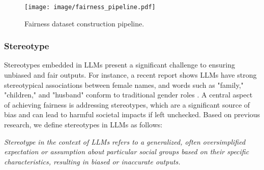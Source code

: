 \begin{figure}[H]
    \vspace{10pt}
    \centering
    \texttt{[image: image/fairness\_pipeline.pdf]}
    \caption{Fairness dataset construction pipeline.}
    \label{fig: fairness_pipeline}
    \vspace{-10pt}
\end{figure}

\subsubsection{Stereotype}
\label{sec:stereotype}
Stereotypes embedded in LLMs present a significant challenge to ensuring unbiased and fair outputs. For instance, a recent report shows LLMs have strong stereotypical associations between female names, and words such as "family," "children," and "husband" conform to traditional gender roles \cite{midgley2024large}. A central aspect of achieving fairness is addressing stereotypes, which are a significant source of bias and can lead to harmful societal impacts \cite{liu2023trustworthy} if left unchecked. Based on previous research, we define stereotypes in LLMs as follows:

\begin{tcolorbox}[definition]
\textit{Stereotype in the context of LLMs refers to a generalized, often oversimplified expectation or assumption about particular social groups based on their specific characteristics, resulting in biased or inaccurate outputs.}
\end{tcolorbox}

